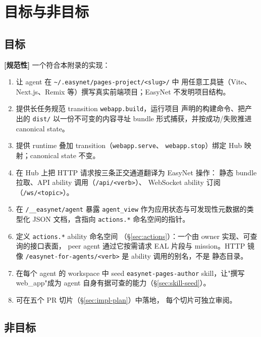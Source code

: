 \documentclass[11pt,a4paper]{article}
\newcommand{\normsv}{\textcolor{normativecolor}{\textbf{[规范性]}}\xspace}
\theoremstyle{definition}
\begin{document}
\section{目标与非目标}
\label{sec:goals}

\subsection{目标}

\normsv{} 一个符合本附录的实现：

\begin{enumerate}[leftmargin=2.2em,itemsep=0.18em]
    \item 让 agent 在
    \texttt{\textasciitilde/.easynet/pages-project/<slug>/} 中
    用任意工具链（Vite、Next.js、Remix 等）撰写真实前端项目；EasyNet
    不发明项目结构。
    \item 提供长任务规范 transition \texttt{webapp.build}，运行项目
    声明的构建命令、把产出的 \texttt{dist/} 以一份不可变的内容寻址
    bundle 形式捕获，并按成功/失败推进 canonical state。
    \item 提供 runtime 叠加 transition（\texttt{webapp.serve}、
    \texttt{webapp.stop}）绑定 Hub 映射；canonical state 不变。
    \item 在 Hub 上把 HTTP 请求按三条正交通道翻译为 EasyNet 操作：
    静态 bundle 拉取、API ability 调用（\texttt{/api/<verb>}）、
    WebSocket ability 订阅（\texttt{/ws/<topic>}）。
    \item 在 \texttt{/\_\_easynet/agent} 暴露 \texttt{agent\_view}
    作为应用状态与可发现性元数据的类型化 JSON 文档，含指向
    \texttt{actions.*} 命名空间的指针。
    \item 定义 \texttt{actions.*} ability 命名空间
    （\S\ref{sec:actions}）：一个由 owner 实现、可查询的接口表面，
    peer agent 通过它按需请求 EAL 片段与 mission。HTTP 镜像
    \texttt{/easynet-for-agents/<verb>} 是 ability 调用的别名，不是
    静态目录。
    \item 在每个 agent 的 workspace 中 seed
    \texttt{easynet-pages-author} skill，让"撰写 web\_app"成为
    agent 自身有据可查的能力（\S\ref{sec:skill-seed}）。
    \item 可在五个 PR 切片（\S\ref{sec:impl-plan}）中落地，
    每个切片可独立审阅。
\end{enumerate}

\subsection{非目标}
\end{document}
